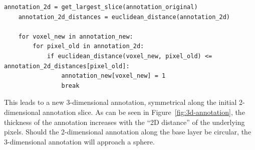 \begin{lstlisting}[caption=3D reconstruction., label={code:3dpseudo}]
    annotation_2d = get_largest_slice(annotation_original)
    annotation_2d_distances = euclidean_distance(annotation_2d)

    for voxel_new in annotation_new:
        for pixel_old in annotation_2d:
            if euclidean_distance(voxel_new, pixel_old) <= annotation_2d_distances[pixel_old]:
                annotation_new[voxel_new] = 1
                break

\end{lstlisting}

This leads to a new 3-dimensional annotation, symmetrical along the initial
2-dimensional annotation slice. As can be seen in Figure~\ref{fig:3d-annotation},
the thickness of the annotation increases with the \enquote{2D distance} of 
the underlying pixels. Should the 2-dimensional annotation along the base 
layer be circular, the 3-dimensional annotation will approach a sphere.





